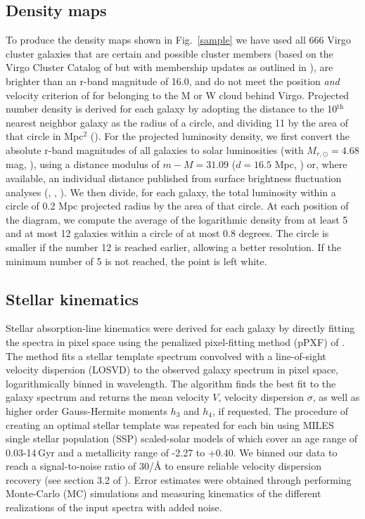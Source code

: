 \documentclass[useAMS,usenatbib]{mn2e}
\newcommand{\sig}{$\sigma$}
\begin{document}
\subsection{Density maps}
\label{density-maps}
To produce the density maps shown in Fig.~\ref{sample} we have used all 666 Virgo cluster galaxies that are certain and possible cluster members (based on the Virgo Cluster Catalog of \citealt{binggeli:1985} but with membership updates as outlined in \citealt{weinmann:2011}), are brighter than an r-band magnitude of 16.0, and do not meet the position \emph{and} velocity criterion of \cite{gavazzi:1999} for belonging to the M or W cloud behind Virgo. Projected number density is derived for each galaxy by adopting the distance to the 10$\mathrm{^{th}}$ nearest neighbor galaxy as  the radius of a circle, and dividing 11 by the area of that circle in Mpc$^2$ (\citealt{dressler:1980}). For the projected luminosity density, we first convert the absolute r-band magnitudes of all galaxies to solar luminosities (with $M_{r,\odot}=4.68$ mag, \citealt{sparke:2006}), using a distance modulus of $m-M=31.09$ ($d=16.5$ Mpc, \citealt{blakeslee:2009}) or, where available, an individual distance published from surface brightness fluctuation analyses (\citealt{blakeslee:2009}, \citealt{jerjen:2004}, \citealt{tonry:2001}). We then divide, for each galaxy, the total luminosity within a circle of 0.2 Mpc projected radius by the area of that circle. At each position of the diagram, we compute the average of the logarithmic density from at least 5 and at most 12 galaxies within a circle of at most 0.8 degrees. The circle is smaller if the number 12 is reached earlier, allowing a better resolution. If the minimum number of 5 is not reached, the point is left white.
 
\subsection{Stellar kinematics}
\label{methods-stekin}

Stellar absorption-line kinematics were derived for each galaxy by directly fitting the spectra in pixel space using the penalized pixel-fitting method (pPXF) of \cite{cappellari:2004}. The method fits a stellar template spectrum convolved with a line-of-sight velocity dispersion (LOSVD) to the observed galaxy spectrum in pixel space, logarithmically binned in wavelength. The algorithm finds the best fit to the galaxy spectrum and returns the mean velocity $V$, velocity dispersion \sig, as well as higher order Gauss-Hermite moments $h_3$ and $h_4$, if requested. The procedure of creating an optimal stellar template was repeated for each bin using MILES single stellar population (SSP) scaled-solar models of \cite{vazdekis:2015} which cover an age range of 0.03-14\,Gyr and a metallicity range of -2.27 to +0.40. We binned our data to reach a signal-to-noise ratio of 30/{\AA} to ensure reliable velocity dispersion recovery (see section 3.2 of \citealt{rys:2013}). Error estimates were obtained through performing Monte-Carlo (MC) simulations and measuring kinematics of the different realizations of the input spectra with added noise.
\end{document}
